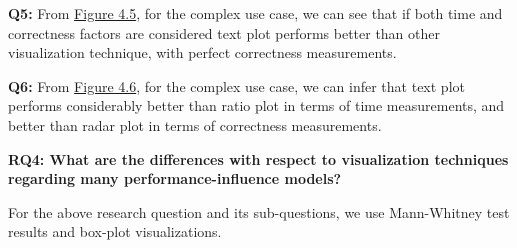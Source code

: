 \textbf{Q5:} From \hyperref[figure:paretoManyQ5]{Figure 4.5}, for the complex use case, we can see that if both time and correctness factors are considered text plot performs better than other visualization technique, with perfect correctness measurements.

\textbf{Q6:} From \hyperref[figure:paretoManyQ6]{Figure 4.6}, for the complex use case, we can infer that text plot performs considerably better than ratio plot in terms of time measurements, and better than radar plot in terms of correctness measurements.

\vskip 0.2in
\begin{mdframed}
\textbf {RQ4: What are the differences with respect to visualization techniques regarding many performance-influence models?}
\end{mdframed}

For the above research question and its sub-questions, we use Mann-Whitney test results and box-plot visualizations. 

